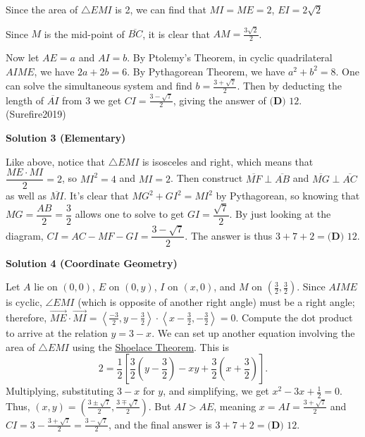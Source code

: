 \begin{enumerate}
 Since the area of $\triangle{EMI}$ is 2, we can find that $MI=ME=2$, $EI=2\sqrt{2}$

 Since $M$ is the mid-point of $\overline{BC}$, it is clear that $AM=\frac{3\sqrt{2}}{2}$.

 Now let $AE=a$ and $AI=b$. By Ptolemy's Theorem, in cyclic quadrilateral $AIME$, we have $2a+2b=6$. By Pythagorean Theorem, we have $a^2+b^2=8$. One can solve the simultaneous system and find $b=\frac{3+\sqrt{7}}{2}$. Then by deducting the length of $\overline{AI}$ from 3 we get $CI=\frac{3-\sqrt{7}}{2}$, giving the answer of $\boxed{\textbf{(D) }12}$. (Surefire2019)

 



\textbf{Solution 3 (Elementary)}

Like above, notice that $\triangle{EMI}$ is isosceles and right, which means that $\dfrac{ME \cdot MI}{2} = 2$, so $MI^2=4$ and $MI = 2$. Then construct $\overline{MF}\perp\overline{AB}$ and $\overline{MG}\perp\overline{AC}$ as well as $\overline{MI}$. It's clear that $MG^2+GI^2 = MI^2$ by Pythagorean, so knowing that $MG = \dfrac{AB}{2} = \dfrac{3}{2}$ allows one to solve to get $GI = \dfrac{\sqrt{7}}{2}$. By just looking at the diagram, $CI=AC-MF-GI=\dfrac{3-\sqrt{7}}{2}$. The answer is thus $3+7+2=\boxed{\textbf{(D) }12}$.

 



\textbf{Solution 4 (Coordinate Geometry)}

Let $A$ lie on $(0,0)$, $E$ on $(0,y)$, $I$ on $(x,0)$, and $M$ on $\left(\frac{3}{2},\frac{3}{2}\right)$. Since ${AIME}$ is cyclic, $\angle EMI$ (which is opposite of another right angle) must be a right angle; therefore, $\overrightarrow{ME} \cdot \overrightarrow{MI} = \left<\frac{-3}{2}, y-\frac{3}{2}\right> \cdot \left<x-\frac{3}{2}, -\frac{3}{2}\right> = 0$. Compute the dot product to arrive at the relation $y=3-x$. We can set up another equation involving the area of $\triangle EMI$ using the \href{https://artofproblemsolving.com/wiki/index.php?title=Shoelace\_Theorem}{Shoelace Theorem}. This is 
 \[2=\frac{1}{2}\left[\frac{3}{2}\left(y-\frac{3}{2}\right)-xy+\frac{3}{2}\left(x+\frac{3}{2}\right)\right].\] Multiplying, substituting $3-x$ for $y$, and simplifying, we get $x^2 -3x + \frac{1}{2}=0$. Thus, $(x,y)=\left(\frac{3 \pm \sqrt{7}}{2},\frac{3 \mp \sqrt{7}}{2}\right)$. But $AI>AE$, meaning $x=AI=\frac{3 + \sqrt{7}}{2}$ and $CI = 3-\frac{3 + \sqrt{7}}{2}=\frac{3 - \sqrt{7}}{2}$, and the final answer is $3+7+2=\boxed{\textbf{(D) }12}$.


\end{enumerate}
